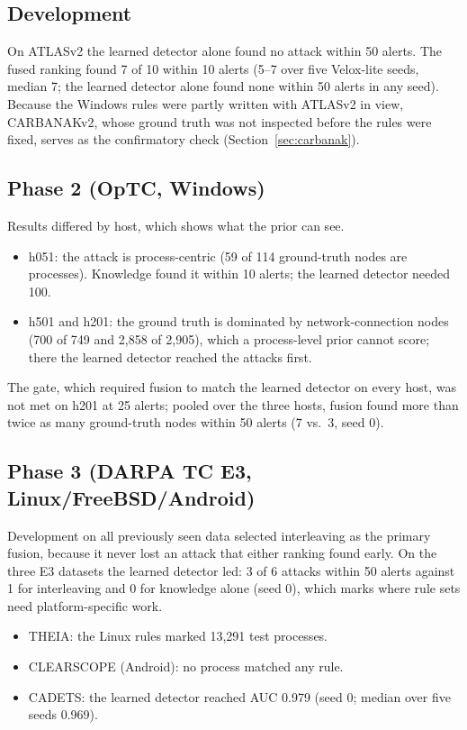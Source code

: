 \documentclass[acmlarge,screen,review]{acmart}
\begin{document}
\subsection{Development}
On ATLASv2 the learned detector alone found no attack within 50 alerts. The fused ranking found 7 of 10 within
10 alerts (5--7 over five Velox-lite seeds, median 7; the learned detector alone found none within 50 alerts in any
seed). Because the Windows rules were partly written with ATLASv2 in view, CARBANAKv2, whose ground truth was not
inspected before the rules were fixed, serves as the confirmatory check (Section~\ref{sec:carbanak}).

\subsection{Phase 2 (OpTC, Windows)}
Results differed by host, which shows what the prior can see.
\begin{itemize}
\item h051: the attack is process-centric (59 of 114 ground-truth nodes are processes). Knowledge found it within
10 alerts; the learned detector needed 100.
\item h501 and h201: the ground truth is dominated by network-connection nodes (700 of 749 and 2{,}858 of 2{,}905),
which a process-level prior cannot score; there the learned detector reached the attacks first.
\end{itemize}
The gate, which required fusion to match the learned detector on every host, was not met on h201 at 25 alerts;
pooled over the three hosts, fusion found more than twice as many ground-truth nodes within 50 alerts (7 vs.\ 3,
seed 0).

\subsection{Phase 3 (DARPA TC E3, Linux/FreeBSD/Android)}
Development on all previously seen data selected interleaving as the primary fusion, because it never lost an
attack that either ranking found early. On the three E3 datasets the learned detector led: 3 of 6 attacks within 50
alerts against 1 for interleaving and 0 for knowledge alone (seed 0), which marks where rule sets need
platform-specific work.
\begin{itemize}
\item THEIA: the Linux rules marked 13{,}291 test processes.
\item CLEARSCOPE (Android): no process matched any rule.
\item CADETS: the learned detector reached AUC 0.979 (seed 0; median over five seeds 0.969).
\end{itemize}
\end{document}
